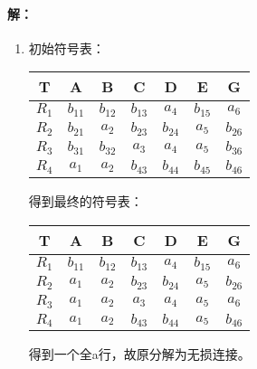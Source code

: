\paragraph{解：}
\begin{enumerate}
	\item 初始符号表：
	\begin{table}[H]
		\centering
		\begin{tabular}{|c|c|c|c|c|c|c|}
			\hline
			T & A & B & C & D & E & G \\\hline
			$R_{1}$ & $b_{11}$ & $b_{12}$ & $b_{13}$ & $a_{4}$ & $b_{15}$ & $a_{6}$ \\
			$R_{2}$ & $b_{21}$ & $a_{2}$ & $b_{23}$ & $b_{24}$ & $a_{5}$ & $b_{26}$ \\
			$R_{3}$ & $b_{31}$ & $b_{32}$ & $a_{3}$ & $a_{4}$ & $a_{5}$ & $b_{36}$ \\
			$R_{4}$ & $a_{1}$ & $a_{2}$ & $b_{43}$ & $b_{44}$ & $b_{45}$ & $b_{46}$ \\\hline
		\end{tabular}
	\end{table}
	得到最终的符号表：
	\begin{table}[H]
		\centering
		\begin{tabular}{|c|c|c|c|c|c|c|}
			\hline
			T & A & B & C & D & E & G \\\hline
			$R_{1}$ & $b_{11}$ & $b_{12}$ & $b_{13}$ & $a_{4}$ & $b_{15}$ & $a_{6}$ \\
			$R_{2}$ & $a_{1}$ & $a_{2}$ & $b_{23}$ & $b_{24}$ & $a_{5}$ & $b_{26}$ \\
			\textbf{$R_{3}$} & \textbf{$a_{1}$} & \textbf{$a_{2}$} & \textbf{$a_{3}$} & \textbf{$a_{4}$} & \textbf{$a_{5}$} & \textbf{$a_{6}$} \\
			$R_{4}$ & $a_{1}$ & $a_{2}$ & $b_{43}$ & $b_{44}$ & $a_{5}$ & $b_{46}$ \\\hline
		\end{tabular}
	\end{table}
	得到一个全a行，故原分解为无损连接。
\end{enumerate}